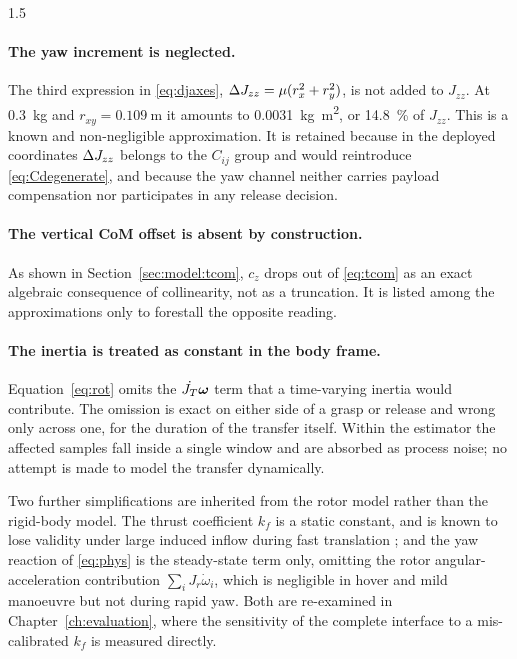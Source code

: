\begin{spacing}{1.5}
\paragraph{The yaw increment is neglected.} The third expression in
\eqref{eq:djaxes}, $\Delta J_{zz} = \mu(r_x^2 + r_y^2)$, is not added to $J_{zz}$. At
\SI{0.3}{\kg} and $r_{xy} = \SI{0.109}{\meter}$ it amounts to
\SI{0.0031}{\kg\meter\squared}, or \SI{14.8}{\percent} of $J_{zz}$. This is a
known and non-negligible approximation. It is retained because in the deployed
coordinates $\Delta J_{zz}$ belongs to the $C_{ij}$ group and would reintroduce
\eqref{eq:Cdegenerate}, and because the yaw channel neither carries payload
compensation nor participates in any release decision.

\paragraph{The vertical CoM offset is absent by construction.} As shown in
Section~\ref{sec:model:tcom}, $c_z$ drops out of \eqref{eq:tcom} as an exact
algebraic consequence of collinearity, not as a truncation. It is listed among
the approximations only to forestall the opposite reading.

\paragraph{The inertia is treated as constant in the body frame.}
Equation~\eqref{eq:rot} omits the $\dot{J_T}\bm{\omega}$ term that a
time-varying inertia would contribute. The omission is exact on either side of a
grasp or release and wrong only across one, for the duration of the transfer
itself. Within the estimator the affected samples fall inside a single window and
are absorbed as process noise; no attempt is made to model the transfer
dynamically.

Two further simplifications are inherited from the rotor model rather than the
rigid-body model. The thrust coefficient $k_f$ is a static constant, and is known
to lose validity under large induced inflow during fast translation
\cite{bangura2012}; and the yaw reaction of \eqref{eq:phys} is the steady-state
term only, omitting the rotor angular-acceleration contribution
$\sum_i J_r \dot\omega_i$, which is negligible in hover and mild manoeuvre but
not during rapid yaw. Both are re-examined in Chapter~\ref{ch:evaluation}, where
the sensitivity of the complete interface to a mis-calibrated $k_f$ is measured
directly.

\end{spacing}
\newpage
